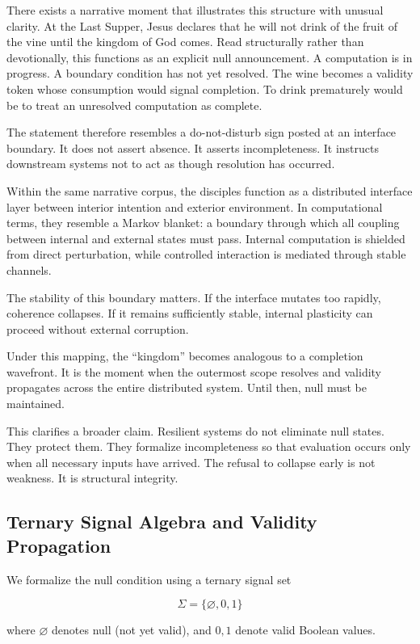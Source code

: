 \documentclass[12pt]{article}
\begin{document}
There exists a narrative moment that illustrates this structure with unusual clarity. At the Last Supper, Jesus declares that he will not drink of the fruit of the vine until the kingdom of God comes. Read structurally rather than devotionally, this functions as an explicit null announcement. A computation is in progress. A boundary condition has not yet resolved. The wine becomes a validity token whose consumption would signal completion. To drink prematurely would be to treat an unresolved computation as complete.

The statement therefore resembles a do-not-disturb sign posted at an interface boundary. It does not assert absence. It asserts incompleteness. It instructs downstream systems not to act as though resolution has occurred.

Within the same narrative corpus, the disciples function as a distributed interface layer between interior intention and exterior environment. In computational terms, they resemble a Markov blanket: a boundary through which all coupling between internal and external states must pass. Internal computation is shielded from direct perturbation, while controlled interaction is mediated through stable channels.

The stability of this boundary matters. If the interface mutates too rapidly, coherence collapses. If it remains sufficiently stable, internal plasticity can proceed without external corruption.

Under this mapping, the ``kingdom'' becomes analogous to a completion wavefront. It is the moment when the outermost scope resolves and validity propagates across the entire distributed system. Until then, null must be maintained.

This clarifies a broader claim. Resilient systems do not eliminate null states. They protect them. They formalize incompleteness so that evaluation occurs only when all necessary inputs have arrived. The refusal to collapse early is not weakness. It is structural integrity.

\subsection{Ternary Signal Algebra and Validity Propagation}

We formalize the null condition using a ternary signal set

\[
\Sigma = \{\varnothing, 0, 1\}
\]

where $\varnothing$ denotes null (not yet valid), and $0,1$ denote valid Boolean values.
\end{document}
